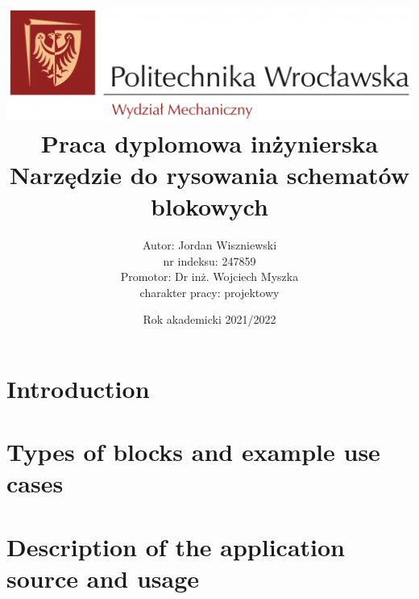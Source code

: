 \documentclass[12pt,a4paper]{report}
\author{
	{Autor: Jordan Wiszniewski}\\
	{nr indeksu: 247859}\\
	{Promotor: Dr inż. Wojciech Myszka}\\
	{charakter pracy: projektowy}
}
\date{Rok akademicki 2021/2022}
\title{
	{\includegraphics[width = \textwidth]{logo-pwr-wm.png}}
	{\bigbreak}
	{Praca dyplomowa inżynierska}\\
	{\bigbreak}
	\textbf{Narzędzie do rysowania schematów blokowych}
}
\begin{document}
\maketitle

\tableofcontents

\chapter{Introduction}


\chapter{Types of blocks and example use cases}


\chapter{Description of the application source and usage}

\end{document}
